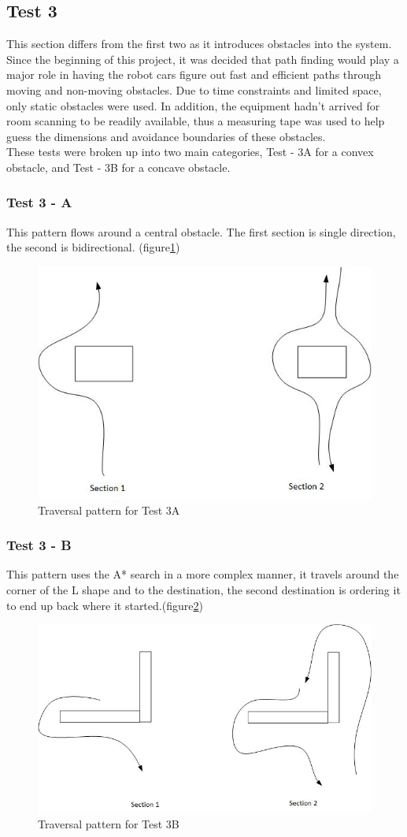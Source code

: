 \documentclass[10pt,a4paper]{article}
\begin{document}
	\subsection*{Test 3}
	This section differs from the first two as it introduces obstacles into the system. Since the beginning of this project, it was decided that path finding would play a major role in having the robot cars figure out fast and efficient paths through moving and non-moving obstacles. Due to time constraints and limited space, only static obstacles were used. In addition, the equipment hadn't arrived for room scanning to be readily available, thus a measuring tape was used to help guess the dimensions and avoidance boundaries of these obstacles.
	\\
	These tests were broken up into two main categories, Test - 3A for a convex obstacle, and Test - 3B for a concave obstacle.
	
	\subsubsection*{Test 3 - A}
	This pattern flows around a central obstacle. The first section is single direction, the second is bidirectional. (figure\ref{fig:convex_travesal})
		\begin{figure}
			\centering
			\includegraphics[width=.6\textwidth]{convex_traversals.jpg}
			\caption{Traversal pattern for Test 3A}
			\label{fig:convex_travesal}
		\end{figure}
	\subsubsection*{Test 3 - B}
	This pattern uses the A* search in a more complex manner, it travels around the corner of the L shape and to the destination, the second destination is ordering it to end up back where it started.(figure\ref{fig:concave_travesal})
		\begin{figure}
			\centering
			\includegraphics[width=.6\textwidth]{concave_traversals.jpg}
			\caption{Traversal pattern for Test 3B}
			\label{fig:concave_travesal}
		\end{figure}
	
\end{document}
